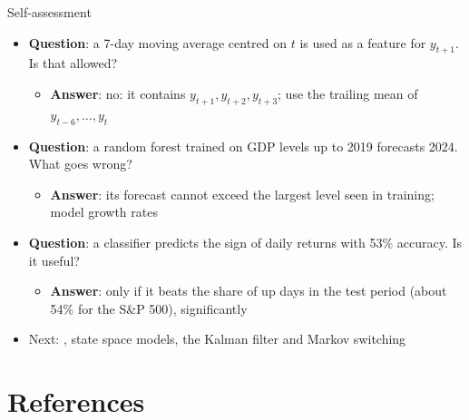 \begin{frame}{Self-assessment}
\itemsize{\small}
\begin{itemize}
    \item \textbf{Question}: a 7-day moving average centred on $t$ is used as a feature for $y_{t+1}$. Is that allowed?
    \begin{itemize}
        \item \textbf{Answer}: no: it contains $y_{t+1}, y_{t+2}, y_{t+3}$; use the trailing mean of $y_{t-6}, \dots, y_t$
    \end{itemize}
    \item \textbf{Question}: a random forest trained on GDP levels up to 2019 forecasts 2024. What goes wrong?
    \begin{itemize}
        \item \textbf{Answer}: its forecast cannot exceed the largest level seen in training; model growth rates
    \end{itemize}
    \item \textbf{Question}: a classifier predicts the sign of daily returns with 53\% accuracy. Is it useful?
    \begin{itemize}
        \item \textbf{Answer}: only if it beats the share of up days in the test period (about 54\% for the S\&P 500), significantly
    \end{itemize}
    \item Next: , state space models, the Kalman filter and Markov switching
\end{itemize}
\end{frame}


\section{References}

